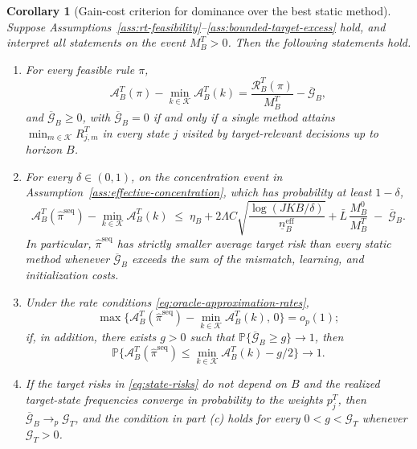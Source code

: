 \documentclass[a4paper, 12pt]{article}
\theoremstyle{plain}
\newtheorem{corollary}{Corollary}
\theoremstyle{remark}
\newcommand{\Prb}{\mathbb{P}}
\newcommand{\Kcal}{\mathcal{K}}
\newcommand{\1}{\mathbf{1}}
\begin{document}
\begin{corollary}[Gain-cost criterion for dominance over the best static method]
\label{cor:static-dominance}
Suppose Assumptions~\ref{ass:rt-feasibility}--\ref{ass:bounded-target-excess} hold, and interpret all statements on the event \(M^T_B>0\). Then the following statements hold.
\begin{enumerate}[label=(\alph*), leftmargin=*]
    \item For every feasible rule \(\pi\),
    \begin{equation}
    \label{eq:static-gap-identity}
        \mathcal A^T_B(\pi)-\min_{k\in\Kcal}\mathcal A^T_B(k)
        =\frac{\mathcal R^T_B(\pi)}{M^T_B}-\overline{\mathcal G}_B ,
    \end{equation}
    and \(\overline{\mathcal G}_B\geq 0\), with \(\overline{\mathcal G}_B=0\) if and only if a single method attains \(\min_{m\in\Kcal}R^T_{j,m}\) in every state \(j\) visited by target-relevant decisions up to horizon \(B\).
    \item For every \(\delta\in(0,1)\), on the concentration event in Assumption~\ref{ass:effective-concentration}, which has probability at least \(1-\delta\),
    \begin{equation}
    \label{eq:static-gap-bound}
        \mathcal A^T_B(\widehat\pi^{\mathrm{seq}})-\min_{k\in\Kcal}\mathcal A^T_B(k)
        \;\leq\;
        \eta_B
        +2\Lambda C\sqrt{\frac{\log(JKB/\delta)}{\underline n^{\mathrm{eff}}_B}}
        +\bar L\,\frac{M^0_B}{M^T_B}
        \;-\;\overline{\mathcal G}_B .
    \end{equation}
    In particular, \(\widehat\pi^{\mathrm{seq}}\) has strictly smaller average target risk than every static method whenever \(\overline{\mathcal G}_B\) exceeds the sum of the mismatch, learning, and initialization costs.
    \item Under the rate conditions \eqref{eq:oracle-approximation-rates},
    \begin{equation*}
        \max\Big\{\mathcal A^T_B(\widehat\pi^{\mathrm{seq}})-\min_{k\in\Kcal}\mathcal A^T_B(k),\,0\Big\}=o_p(1);
    \end{equation*}
    if, in addition, there exists \(g>0\) such that \(\Prb\{\overline{\mathcal G}_B\geq g\}\to 1\), then
    \begin{equation*}
        \Prb\Big\{\mathcal A^T_B(\widehat\pi^{\mathrm{seq}})\leq\min_{k\in\Kcal}\mathcal A^T_B(k)-g/2\Big\}\to 1 .
    \end{equation*}
    \item If the target risks in \eqref{eq:state-risks} do not depend on \(B\) and the realized target-state frequencies converge in probability to the weights \(p^T_j\), then \(\overline{\mathcal G}_B\to_p\mathcal G_T\), and the condition in part (c) holds for every \(0<g<\mathcal G_T\) whenever \(\mathcal G_T>0\).
\end{enumerate}
\end{corollary}
\end{document}
